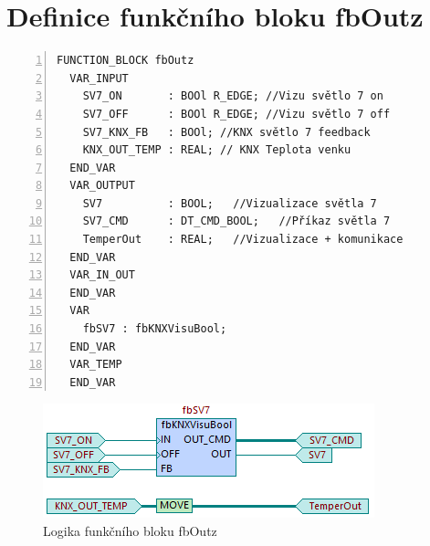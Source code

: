 \chapter{Definice funkčního bloku fbOutz}
\label{apend:fbOutz}
\begin{lstlisting}[language=ST, breaklines=true, numbers=left, numberstyle=\small, numbersep=10pt, frame=single, basicstyle=\ttfamily\small, caption={Definice funkčního bloku fbOutz}, label={lst:fbOutz}]
  FUNCTION_BLOCK fbOutz
  VAR_INPUT
    SV7_ON       : BOOl R_EDGE; //Vizu světlo 7 on
    SV7_OFF      : BOOl R_EDGE; //Vizu světlo 7 off
    SV7_KNX_FB   : BOOl; //KNX světlo 7 feedback
    KNX_OUT_TEMP : REAL; // KNX Teplota venku
  END_VAR
  VAR_OUTPUT
    SV7          : BOOL;   //Vizualizace světla 7
    SV7_CMD      : DT_CMD_BOOL;   //Příkaz světla 7
    TemperOut    : REAL;   //Vizualizace + komunikace
  END_VAR
  VAR_IN_OUT
  END_VAR
  VAR
    fbSV7 : fbKNXVisuBool;
  END_VAR
  VAR_TEMP
  END_VAR
\end{lstlisting}
\begin{figure}[!ht]
  \begin{center}
  \includegraphics[scale=1.0]{obrazky/fbOutz.png}
  \end{center}
  \caption[Logika funkčního bloku fbOutz]{Logika funkčního bloku fbOutz}
  \label{fig:fbOutz}
\end{figure}
\pagebreak
